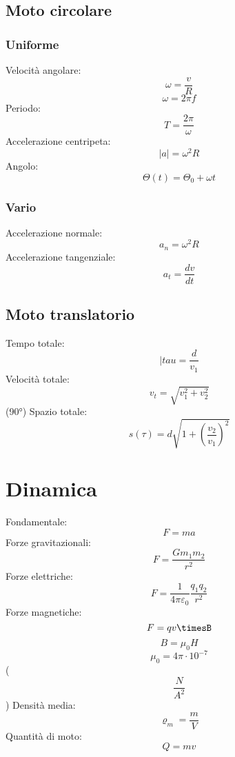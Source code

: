 \documentclass[a4paper,10pt]{book}
\begin{document}
\section{Moto circolare}
\subsection{Uniforme}
Velocità angolare: \[\omega=\frac{v}{R}\]
\[\omega=2\pi f\]
Periodo: \[T=\frac{2\pi}{\omega}\]
Accelerazione centripeta: \[|a|=\omega^2R\]
Angolo: \[\varTheta(t)=\varTheta_0+\omega t\]
\subsection{Vario}
Accelerazione normale: \[a_n=\omega^2R\]
Accelerazione tangenziale: \[a_t=\frac{dv}{dt}\]

\section{Moto translatorio}
Tempo totale: \[|tau=\frac{d}{v_1}\]
Velocità totale: \[v_t=\sqrt{v_1^2+v_2^2}\] (90°)
Spazio totale: \[s(\tau)=d\sqrt{1+(\frac{v_2}{v_1})^2}\]

\chapter{Dinamica}
Fondamentale: \[F=ma\]
Forze gravitazionali: \[F=\frac{Gm_1m_2}{r^2}\]
Forze elettriche: \[F=\frac{1}{4\pi \varepsilon_0}\frac{q_1q_2}{r^2}\]
Forze magnetiche: \[F=qv\timesB\]
\[B=\mu_0H\]
\[\mu_0=4\pi\cdot10^{-7}\] (\[\frac{N}{A^2}\])
Densità media: \[\varrho_m=\frac{m}{V}\]
Quantità di moto: \[Q=mv\]
\end{document}
